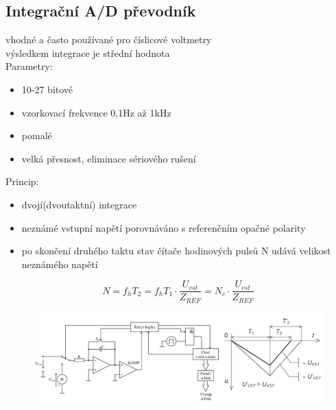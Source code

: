 \subsection*{Integrační A/D převodník}
vhodné a často používané pro číslicové voltmetry\\
výsledkem integrace je střední hodnota\\
Parametry:
\begin{itemize}
    \item 10-27 bitové
    \item vzorkovací frekvence 0,1Hz až 1kHz 
    \item pomalé
    \item velká přesnost, eliminace sériového rušení 
\end{itemize}
Princip:
\begin{itemize}
    \item dvojí(dvoutaktní) integrace
    \item neznámé vstupní napětí porovnáváno s referenčním opačné polarity
    \item po skončení druhého taktu stav čítače hodinových pulsů N udává velikost neznámého napětí
\end{itemize}

\begin{equation}
    N = f_hT_2 = f_hT_1\cdot \frac{U_{vst}}{Z_{REF}} = N_c \cdot \frac{U_{vst}}{Z_{REF}} 
\end{equation}
\begin{figure}[H]
    \includegraphics*[scale = 1]{images/adc_integrac.png}
\end{figure}

